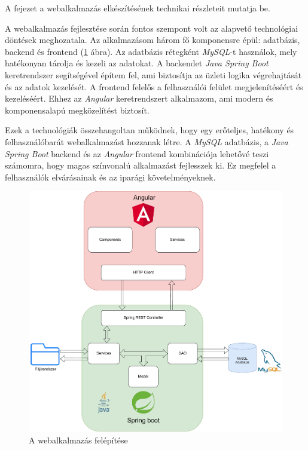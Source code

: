 
A fejezet a webalkalmazás elkészítésének technikai részleteit mutatja be.



A webalkalmazás fejlesztése során fontos szempont volt az alapvető technológiai döntések meghozatala. Az alkalmazásom három fő komponensre épül: adatbázis, backend és frontend (\ref{fig:felepites} ábra). Az adatbázis rétegként \textit{MySQL}-t \cite{MySQL} használok, mely hatékonyan tárolja és kezeli az adatokat. A backendet \textit{Java Spring Boot} \cite{spring_boot} keretrendszer segítségével építem fel, ami biztosítja az üzleti logika végrehajtását és az adatok kezelését. A frontend felelős a felhasználói felület megjelenítéséért és kezeléséért. Ehhez az \textit{Angular} \cite{angular} keretrendszert alkalmazom, ami modern és komponensalapú megközelítést biztosít.

Ezek a technológiák összehangoltan működnek, hogy egy erőteljes, hatékony és felhasználóbarát webalkalmazást hozzanak létre. A \textit{MySQL} \cite{MySQL} adatbázis, a \textit{Java Spring Boot} \cite{spring_boot} backend és az \textit{Angular} \cite{angular} frontend kombinációja lehetővé teszi számomra, hogy magas színvonalú alkalmazást fejlesszek ki. Ez megfelel a felhasználók elvárásainak és az iparági követelményeknek.

\newpage

\begin{figure}[h]
\centering
\includegraphics[width=\textwidth]{images/A_webalkalmazás_felépítése.pdf}
\caption{A webalkalmazás felépítése}
\label{fig:felepites}
\end{figure}

